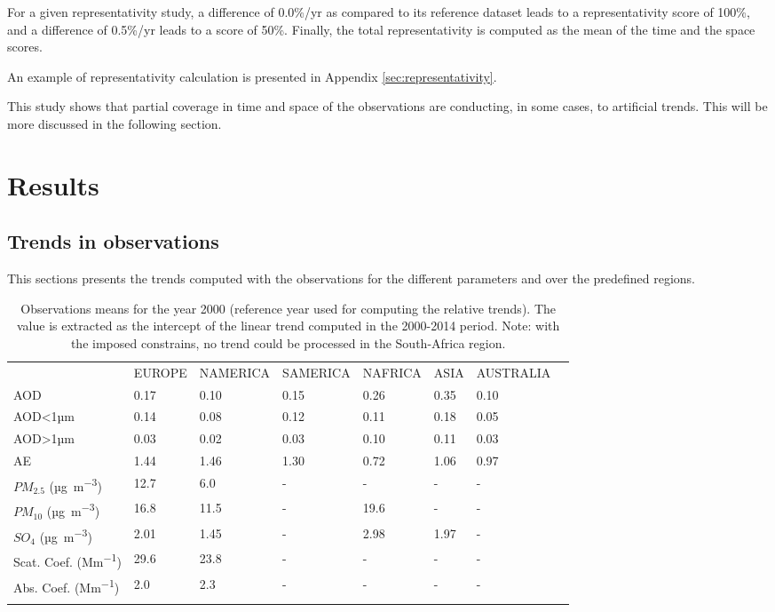 \documentclass[journal abbreviation, manuscript]{copernicus}
\begin{document}
For a given representativity study, a difference of 0.0\%/yr as compared to its reference dataset leads to a representativity score of 100\%, and a difference of 0.5\%/yr leads to a score of 50\%.
Finally, the total representativity is computed as the mean of the time and the space scores.

An example of representativity calculation is presented in Appendix \ref{sec:representativity}.

This study shows that partial coverage in time and space of the observations are conducting, in some cases, to artificial trends. This will be more discussed in the following section.

\section{Results}

\subsection{Trends in observations}
This sections presents the trends computed with the observations for the different parameters and over the predefined regions.

\begin{table}
 \begin{tabular}{llllllll}
  \tophline
                                & EUROPE & NAMERICA & SAMERICA & NAFRICA & ASIA & AUSTRALIA \\
  \middlehline
  AOD                           & 0.17   & 0.10     & 0.15     & 0.26    & 0.35 & 0.10      \\
  AOD<1µm                       & 0.14   & 0.08     & 0.12     & 0.11    & 0.18 & 0.05      \\
  AOD>1µm                       & 0.03   & 0.02     & 0.03     & 0.10    & 0.11 & 0.03      \\
  AE                            & 1.44   & 1.46     & 1.30     & 0.72    & 1.06 & 0.97      \\
  $PM_{2.5}$ (\unit{µg.m^{-3}}) & 12.7   & 6.0      & -        & -       & -    & -         \\
  $PM_{10}$ (\unit{µg.m^{-3}})  & 16.8   & 11.5     & -        & 19.6    & -    & -         \\
  $SO_{4}$ (\unit{µg.m^{-3}})   & 2.01   & 1.45     & -        & 2.98    & 1.97 & -         \\
  Scat. Coef. (\unit{Mm^{-1}})  & 29.6   & 23.8     & -        & -       & -    & -         \\
  Abs. Coef. (\unit{Mm^{-1}})   & 2.0    & 2.3      & -        & -       & -    & -         \\
  \bottomhline
 \end{tabular}

 \caption{Observations means for the year 2000 (reference year used for computing the relative trends). The value is extracted as the intercept of the linear trend computed in the 2000-2014 period. Note: with the imposed constrains, no trend could be processed in the South-Africa region.}
 \label{table:obs_2000mean}
\end{table}
\end{document}
